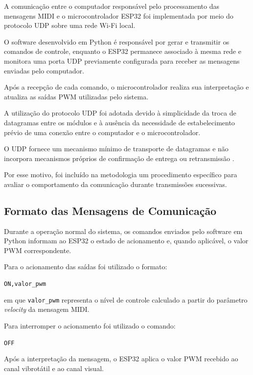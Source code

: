 A comunicação entre o computador responsável pelo processamento das mensagens MIDI e o microcontrolador ESP32 foi implementada por meio do protocolo UDP sobre uma rede Wi-Fi local.

O software desenvolvido em Python é responsável por gerar e transmitir os comandos de controle, enquanto o ESP32 permanece associado à mesma rede e monitora uma porta UDP previamente configurada para receber as mensagens enviadas pelo computador.

Após a recepção de cada comando, o microcontrolador realiza sua interpretação e atualiza as saídas PWM utilizadas pelo sistema.

A utilização do protocolo UDP foi adotada devido à simplicidade da troca de datagramas entre os módulos e à ausência da necessidade de estabelecimento prévio de uma conexão entre o computador e o microcontrolador.

O UDP fornece um mecanismo mínimo de transporte de datagramas e não incorpora mecanismos próprios de confirmação de entrega ou retransmissão \cite{postel1980udp}.

Por esse motivo, foi incluído na metodologia um procedimento específico para avaliar o comportamento da comunicação durante transmissões sucessivas.

\subsection{Formato das Mensagens de Comunicação}
\label{sec:formato_mensagens_udp}

Durante a operação normal do sistema, os comandos enviados pelo software em Python informam ao ESP32 o estado de acionamento e, quando aplicável, o valor PWM correspondente.

Para o acionamento das saídas foi utilizado o formato:

\begin{center}
\texttt{ON,valor\_pwm}
\end{center}

em que \texttt{valor\_pwm} representa o nível de controle calculado a partir do parâmetro \textit{velocity} da mensagem MIDI.

Para interromper o acionamento foi utilizado o comando:

\begin{center}
\texttt{OFF}
\end{center}

Após a interpretação da mensagem, o ESP32 aplica o valor PWM recebido ao canal vibrotátil e ao canal visual.


